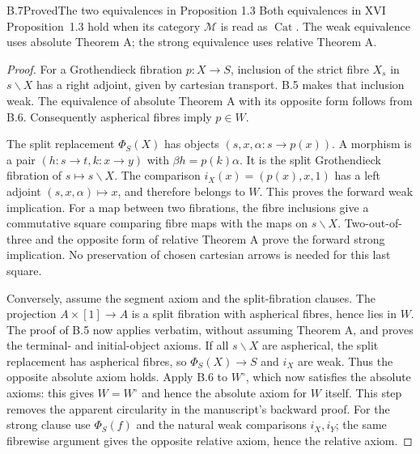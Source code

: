 \begin{claim}{B.7}{Proved}{The two equivalences in Proposition 1.3}
Both equivalences in XVI Proposition~1.3 hold when its category
$\mathcal M$ is read as $\operatorname{Cat}$. The weak equivalence uses
absolute Theorem A; the strong equivalence uses relative Theorem A.
\end{claim}
\begin{proof}
For a Grothendieck fibration $p:X\to S$, inclusion of the strict fibre
$X_s$ in $s\backslash X$ has a right adjoint, given by cartesian
transport. B.5 makes that inclusion weak. The equivalence of absolute
Theorem A with its opposite form follows from B.6. Consequently
aspherical fibres imply $p\in W$.

The split replacement $\Phi_S(X)$ has objects $(s,x,\alpha:s\to p(x))$.
A morphism is a pair $(h:s\to t,k:x\to y)$ with
$\beta h=p(k)\alpha$. It is the split Grothendieck fibration of
$s\mapsto s\backslash X$. The comparison
$i_X(x)=(p(x),x,1)$ has a left adjoint $(s,x,\alpha)\mapsto x$,
and therefore belongs to $W$. This proves the forward weak implication.
For a map between two fibrations, the fibre inclusions give a commutative
square comparing fibre maps with the maps on $s\backslash X$.
Two-out-of-three and the opposite form of relative Theorem A prove the
forward strong implication. No preservation of chosen cartesian arrows
is needed for this last square.

Conversely, assume the segment axiom and the split-fibration clauses.
The projection $A\times[1]\to A$ is a split fibration with aspherical
fibres, hence lies in $W$. The proof of B.5 now applies verbatim, without
assuming Theorem A, and proves the terminal- and initial-object axioms.
If all $s\backslash X$ are aspherical, the split replacement has
aspherical fibres, so $\Phi_S(X)\to S$ and $i_X$ are weak. Thus
the opposite absolute axiom holds. Apply B.6 to $W^\circ$, which now
satisfies the absolute axioms: this gives $W=W^\circ$ and hence the
absolute axiom for $W$ itself. This step removes the apparent circularity
in the manuscript's backward proof. For the strong clause use
$\Phi_S(f)$ and the natural weak comparisons $i_X,i_Y$; the same fibrewise
argument gives the opposite relative axiom, hence the relative axiom.
\end{proof}

